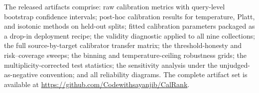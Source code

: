\documentclass[sn-mathphys-num,pdflatex]{sn-jnl}
\begin{document}
The released artifacts comprise: raw calibration metrics with query-level
bootstrap confidence intervals; post-hoc calibration results for temperature,
Platt, and isotonic methods on held-out splits; fitted calibration parameters
packaged as a drop-in deployment recipe; the validity diagnostic applied to all
nine collections; the full source-by-target calibrator transfer matrix; the
threshold-honesty and risk--coverage sweeps; the binning and temperature-ceiling
robustness grids; the multiplicity-corrected test statistics; the sensitivity
analysis under the unjudged-as-negative convention; and all reliability diagrams.
The complete artifact set is available at \url{https://github.com/Codewithsayanjib/CalRank}.


\end{document}
